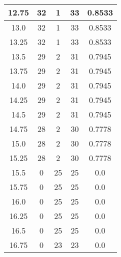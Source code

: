 \documentclass[letterpaper, 12pt]{article}
\begin{document}
\begin{longtable}{|c|c|c|c|c|}
\hline
12.75 & 32 & 1 & 33 & 0.8533 \\
\hline
13.0 & 32 & 1 & 33 & 0.8533 \\
\hline
13.25 & 32 & 1 & 33 & 0.8533 \\
\hline
13.5 & 29 & 2 & 31 & 0.7945 \\
\hline
13.75 & 29 & 2 & 31 & 0.7945 \\
\hline
14.0 & 29 & 2 & 31 & 0.7945 \\
\hline
14.25 & 29 & 2 & 31 & 0.7945 \\
\hline
14.5 & 29 & 2 & 31 & 0.7945 \\
\hline
14.75 & 28 & 2 & 30 & 0.7778 \\
\hline
15.0 & 28 & 2 & 30 & 0.7778 \\
\hline
15.25 & 28 & 2 & 30 & 0.7778 \\
\hline
15.5 & 0 & 25 & 25 & 0.0 \\
\hline
15.75 & 0 & 25 & 25 & 0.0 \\
\hline
16.0 & 0 & 25 & 25 & 0.0 \\
\hline
16.25 & 0 & 25 & 25 & 0.0 \\
\hline
16.5 & 0 & 25 & 25 & 0.0 \\
\hline
16.75 & 0 & 23 & 23 & 0.0 \\
\hline
\end{longtable}
\end{document}
